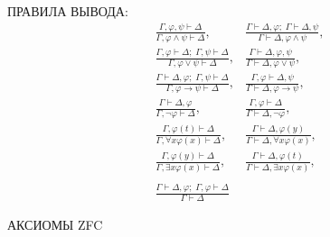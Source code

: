 \documentclass[a4paper,11pt]{article}
\begin{document}
ПРАВИЛА ВЫВОДА:
\medskip
\begin{align*}
&\frac{\Gamma,\varphi,\psi\vdash\Delta}{\Gamma,\varphi\land\psi\vdash\Delta},&
\frac{\Gamma\vdash\Delta,\varphi;\;\Gamma\vdash\Delta,\psi}{\Gamma\vdash\Delta,\varphi\land\psi},
\\
&\frac{\Gamma,\varphi\vdash\Delta;\;\Gamma,\psi\vdash\Delta}{\Gamma,\varphi\lor\psi\vdash\Delta},&
\frac{\Gamma\vdash\Delta,\varphi,\psi}{\Gamma\vdash\Delta,\varphi\lor\psi},
\\
&\frac{\Gamma\vdash\Delta,\varphi;\;\Gamma,\psi\vdash\Delta}{\Gamma,\varphi\rightarrow\psi\vdash\Delta},&
\frac{\Gamma,\varphi\vdash\Delta,\psi}{\Gamma\vdash\Delta,\varphi\rightarrow\psi},
\\
&\frac{\Gamma\vdash\Delta,\varphi}{\Gamma,\neg\varphi\vdash\Delta},&
\frac{\Gamma,\varphi\vdash\Delta}{\Gamma\vdash\Delta,\neg\varphi},
\\
&\frac{\Gamma,\varphi(t)\vdash\Delta}{\Gamma,\forall x\varphi(x)\vdash\Delta}, &
\frac{\Gamma\vdash\Delta,\varphi(y)}{\Gamma\vdash\Delta,\forall x\varphi(x)},
\\
&\frac{\Gamma,\varphi(y)\vdash\Delta}{\Gamma,\exists x\varphi(x)\vdash\Delta}, &
\frac{\Gamma\vdash\Delta,\varphi(t)}{\Gamma\vdash\Delta,\exists x\varphi(x)},
\\\\
&\frac{\Gamma\vdash\Delta,\varphi;\;\Gamma,\varphi\vdash\Delta}{\Gamma\vdash\Delta}
\end{align*}




АКСИОМЫ ZFC
\medskip
\end{document}
